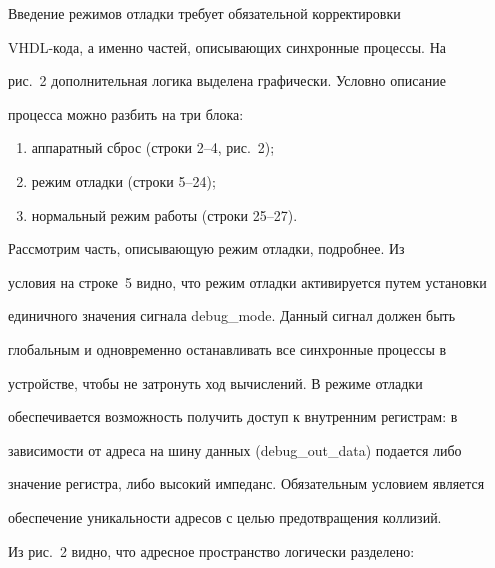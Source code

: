       


      Введение режимов отладки требует обязательной корректировки 


      VHDL-ко\-да, а именно частей, описывающих синхронные процессы. На 


рис.~2 дополнительная логика выделена графически. Условно описание 


процесса можно разбить на три блока:


      \begin{enumerate}[(1)]


      \item аппаратный сброс (строки 2--4, рис.~2);\\[-10pt]


      \item режим отладки (строки 5--24);\\[-10pt]


      \item нормальный режим работы (строки 25--27).


      \end{enumerate}


      


      Рассмотрим часть, описывающую режим отладки, подробнее. Из 


условия на строке~5 видно, что режим отладки активируется путем установки 


единичного значения сигнала debug\_mode. Данный сигнал должен быть 


глобальным и одновременно останавливать все синхронные процессы в 


устройстве, чтобы не затронуть ход вычислений. В режиме отладки 


обеспечивается возможность получить доступ к внутренним регистрам: в 


зависимости от адреса на шину данных (debug\_out\_data) подается либо 


значение регистра, либо высокий импеданс. Обязательным условием является 


обеспечение уникальности адресов с целью предотвращения коллизий.





\pagebreak





      Из рис.~2 видно, что адресное пространство логически разделено:


